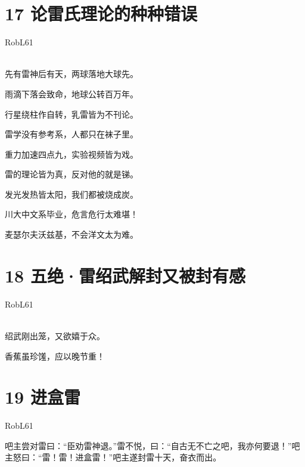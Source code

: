 \documentclass[UTF8,12pt,oneside]{ctexbook}
\begin{document}
    \section{17 论雷氏理论的种种错误}
    \begin{center}
        RobL61
        
        ~\\
        先有雷神后有天，两球落地大球先。
        
        雨滴下落会致命，地球公转百万年。
        
        行星绕柱作自转，乳雷皆为不刊论。
        
        雷学没有参考系，人都只在袜子里。
        
        重力加速四点九，实验视频皆为戏。
        
        雷的理论皆为真，反对他的就是锑。
        
        发光发热皆太阳，我们都被烧成炭。
        
        川大中文系毕业，危言危行太难堪！
        
        麦瑟尔夫沃兹基，不会洋文太为难。
        
    \end{center}
    
    \section{18 五绝·雷绍武解封又被封有感}
    \begin{center}
        RobL61
        
        ~\\
        绍武刚出笼，又欲嬉于众。
        
        香蕉虽珍馐，应以晚节重！
        
        
    \end{center}
    
    \section{19 进盒雷}
    \begin{center}
        \Large
        \songti
        \large
        
        RobL61
        
    \end{center}
    
        吧主尝对雷曰：“臣劝雷神退。”雷不悦，曰：“自古无不亡之吧，我亦何要退！”吧主怒曰：“雷！雷！进盒雷！”吧主遂封雷十天，奋衣而出。
        
\end{document}
